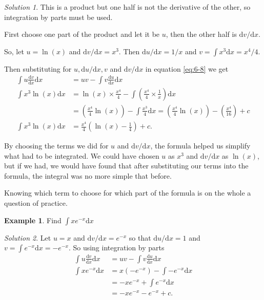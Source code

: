 \documentclass[
  english,
  11pt,
  oneside]{book}
\newcommand{\slide}{}
\theoremstyle{definition}
\theoremstyle{definition}
\newtheorem{example}{Example}[chapter]
\theoremstyle{definition}
\theoremstyle{definition}
\theoremstyle{remark}
\newtheorem*{solution}{Solution}
\begin{document}
\begin{solution}
This is a product but one half is not the derivative of the other, so integration by parts must be used.

First choose one part of the product and let it be \(u\), then the other half is \(\mathrm{d}v/\mathrm{d}x\).

So, let \(u = \ln(x)\) and \(\mathrm{d}v/\mathrm{d}x = x^3\). Then \(\mathrm{d}u/\mathrm{d}x = 1/x\) and \(v=\displaystyle\int x^3\mathrm{d}x = x^4/4\).

Then substituting for \(u, \mathrm{d}u/\mathrm{d}x, v\) and \(\mathrm{d}v/\mathrm{d}x\) in equation \eqref{eq:6-8} we get
\begin{align*}
\int u\frac{\mathrm{d}v}{\mathrm{d}x}\mathrm{d}x& = uv-\int v\frac{\mathrm{d}u}{\mathrm{d}x}\mathrm{d}x\\
\int x^3\ln(x)\mathrm{d}x& = \ln(x)\times \frac{x^4}{4} - \int\left(\frac{x^4}{4}\times\frac{1}{x}\right)\mathrm{d}x\\
&=\left(\frac{x^4}{4}\ln(x)\right)-\int\frac{x^3}{4}\mathrm{d}x = \left(\frac{x^4}{4}\ln(x)\right) - \left(\frac{x^4}{16}\right)+c\\
\int x^3\ln(x)\mathrm{d}x& = \frac{x^4}{4}\left(\ln(x)-\frac14\right)+c.
\end{align*}
\end{solution}

\slide

By choosing the terms we did for \(u\) and \(\mathrm{d}v/\mathrm{d}x\), the formula helped us simplify what had to be integrated. We could have chosen \(u\) as \(x^3\) and \(\mathrm{d}v/\mathrm{d}x\) as \(\ln(x)\), but if we had, we would have found that after substituting our terms into the formula, the integral was no more simple that before.

Knowing which term to choose for which part of the formula is on the whole a question of practice.

\slide

\begin{example}
Find \(\displaystyle\int xe^{-x}\mathrm{d}x\)
\end{example}

\begin{solution}
Let \(u = x\) and \(\mathrm{d}v/\mathrm{d}x=e^{-x}\) so that \(\mathrm{d}u/\mathrm{d}x = 1\) and \(v=\displaystyle\int e^{-x}\mathrm{d}x = -e^{-x}\). So using integration by parts
\begin{align*}
\int u\frac{\mathrm{d}v}{\mathrm{d}x}\mathrm{d}x& = uv-\int v\frac{\mathrm{d}u}{\mathrm{d}x}\mathrm{d}x\\
\int xe^{-x}\mathrm{d}x&=x(-e^{-x})-\int-e^{-x}\mathrm{d}x\\
&=-xe^{-x}+\int e^{-x}\mathrm{d}x\\
&=-xe^{-x}-e^{-x}+c.
\end{align*}
\end{solution}
\end{document}
